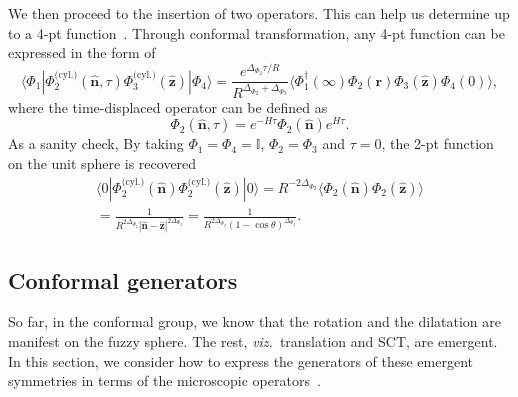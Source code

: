 \documentclass{timesjhep}
\begin{document}
We then proceed to the insertion of two operators. This can help us determine up to a 4-pt function~\cite{Han2023Jun}. Through conformal transformation, any 4-pt function can be expressed in the form of
\begin{equation}
    \langle\Phi_1|\Phi^{\textrm{(cyl.)}}_2(\hat{\mathbf{n}},\tau)\Phi^{\textrm{(cyl.)}}_3(\hat{\mathbf{z}})|\Phi_4\rangle=\frac{e^{\Delta_{\Phi_2}\tau/R}}{R^{\Delta_{\Phi_2}+\Delta_{\Phi_3}}}\langle\Phi_1^\dagger(\infty)\Phi_2(\mathbf{r})\Phi_3(\hat{\mathbf{z}})\Phi_4(0)\rangle,
\end{equation}
where the time-displaced operator can be defined as
\begin{equation}
    \Phi_2(\hat{\mathbf{n}},\tau)=e^{-H\tau}\Phi_2(\hat{\mathbf{n}})e^{H\tau}.
\end{equation}
As a sanity check, By taking $\Phi_1=\Phi_4=\mathbb{I}$, $\Phi_2=\Phi_3$ and $\tau=0$, the 2-pt function on the unit sphere is recovered
\begin{multline}
    \langle0|\Phi^{\textrm{(cyl.)}}_2(\hat{\mathbf{n}})\Phi^{\textrm{(cyl.)}}_2(\hat{\mathbf{z}})|0\rangle=R^{-2\Delta_{\Phi_2}}\langle\Phi_2(\hat{\mathbf{n}})\Phi_2(\hat{\mathbf{z}})\rangle\\=\frac{1}{R^{2\Delta_{\Phi_2}}|\hat{\mathbf{n}}-\hat{\mathbf{z}}|^{2\Delta_{\Phi_2}}}=\frac{1}{R^{2\Delta_{\Phi_2}}(1-\cos\theta)^{\Delta_{\Phi_2}}}.
\end{multline}

\subsection{Conformal generators}
\label{sec:construct_gen}

So far, in the conformal group, we know that the rotation and the dilatation are manifest on the fuzzy sphere. The rest, \textit{viz.}~translation and SCT, are emergent. In this section, we consider how to express the generators of these emergent symmetries in terms of the microscopic operators~\cite{Fardelli2024,Fan2024}.
\end{document}
